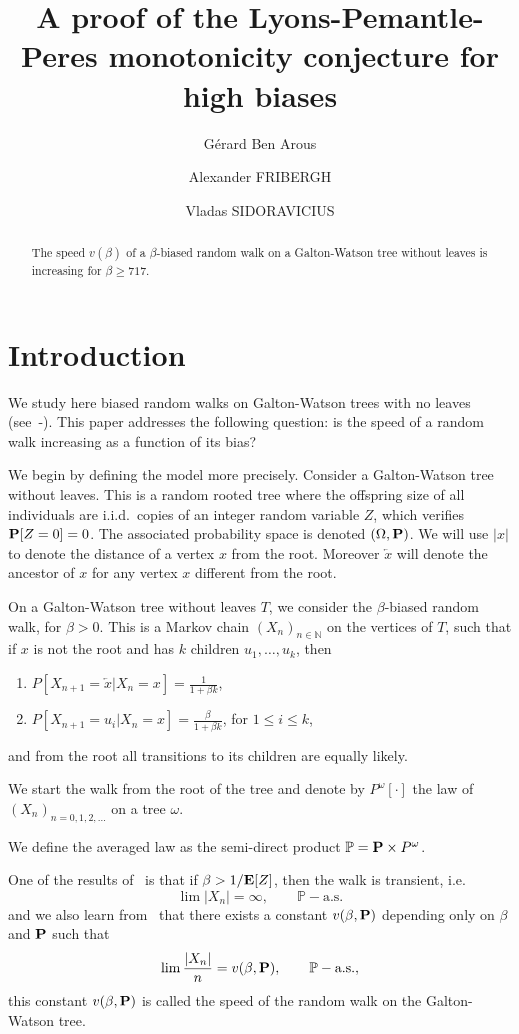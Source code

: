 \documentclass[12pt]{amsart}
\title[]{A proof of the Lyons-Pemantle-Peres monotonicity conjecture for high biases}
\date{}
\author[G.~Ben Arous]{G\'erard Ben Arous}
\author[A.~Fribergh]{Alexander FRIBERGH}
\author[V.~Sidoravicius]{Vladas SIDORAVICIUS}
\numberwithin{equation}{section}
\begin{document}
\maketitle

\begin{abstract}
The speed $v(\beta)$ of a $\beta$-biased random walk on a Galton-Watson tree without leaves is increasing for $\beta \geq 717$.
\end{abstract}

\section{Introduction}

We study here biased random walks on Galton-Watson trees with no leaves (see~\cite{L}-\cite{Lpart}).  This paper addresses the following question: is the speed of a random walk increasing as a function of its bias? 

We begin by defining the model more precisely. Consider a Galton-Watson tree without leaves. This is a random rooted tree where the offspring size of all individuals are i.i.d.~copies of an integer random variable $Z$, which verifies ${\bf P}[Z=0]=0$.  The associated probability space is denoted $(\Omega,{\bf P})$. We will use ${\left\vert {x}\right\vert}$ to denote the distance of a vertex $x$ from the root. Moreover $\overleftarrow{x}$ will denote the ancestor of $x$ for any vertex $x$ different from the root.

On a Galton-Watson tree without leaves $T$, we consider the
$\beta$-biased random walk, for $\beta>0$. This is a Markov chain $(X_n)_{n\in {\mathbb{N}}}$ on the vertices of $T$, such that if $x$ is not the root and has $k$ children $u_1,\ldots, u_k$, then
\begin{enumerate}
\item $P[X_{n+1}=\overleftarrow{x}|X_n=x]=\frac 1 {1+ \beta k}$, 
\item $P[X_{n+1}= u_i |X_n=x] = \frac {\beta}{1+\beta k}$, for $1\leq i\leq k$,
\end{enumerate}
and from the root all transitions to its children are equally likely. 

We start the walk from the root of the tree and denote by $P^{\omega}[\cdot]$ 
the law of $(X_n)_{n=0,1,2, \ldots}$ on a tree $\omega$.

 We define the averaged law as the semi-direct product ${\mathbb{P}}={\bf P} \times P^{\omega}$.

One of the results of~\cite{L} is that if $\beta>1/{\bf E}[Z]$, then the walk is transient, i.e.
\[
\lim {\left\vert {X_n}\right\vert}=\infty, \qquad {\mathbb{P}}-\text{a.s.}
\]
and we also learn from~\cite{LPP} that there exists a constant $v(\beta,{\bf P})$ depending only on $\beta$ and ${\bf P}$ such that
\[
\lim \frac{{\left\vert {X_n}\right\vert}}n = v(\beta,{\bf P}), \qquad {\mathbb{P}}-\text{a.s.},
\]
this constant $v(\beta,{\bf P})$ is called the speed of the random walk on the Galton-Watson tree.
\end{document}
